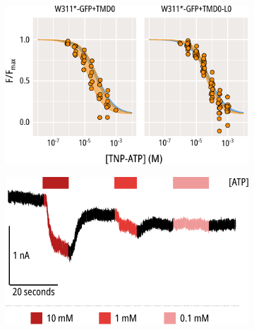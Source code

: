 \begin{figure}[h]
	\centering
	\begin{subfigure}[t]{0.45\textwidth}
		\caption{}\label{ch6fig:tmd0s_unroofed_1}
		\centering
		\includegraphics[width=\textwidth]{tmd0s_unroofed_1.pdf}
	\end{subfigure}
	\hfill
	\begin{subfigure}[t]{0.22\textwidth}
		\caption{}\label{ch6fig:tmd0_atp_trace}
		\centering
		\includegraphics[width=\textwidth]{tmd0_atp_trace.pdf}
	\end{subfigure}
	\hfill
	\begin{subfigure}[t]{0.22\textwidth}
		\caption{}\label{ch6fig:tmd0_atp_1}
		\centering

\end{subfigure}
\end{figure}

